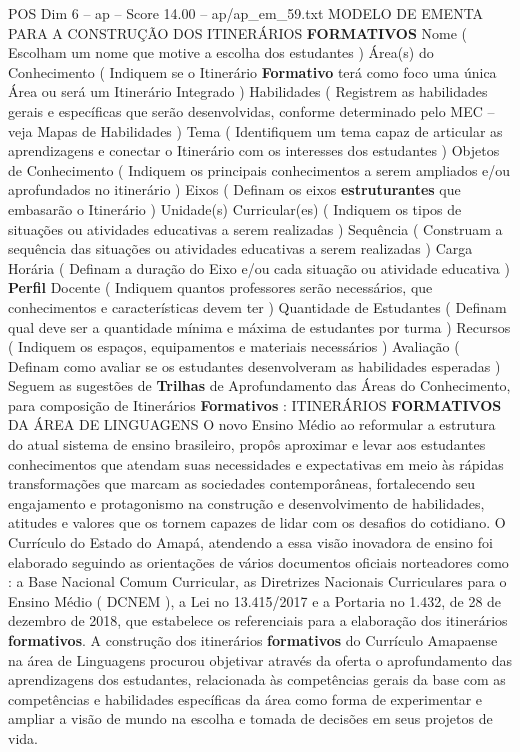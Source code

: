 \begin{textsample}{POS Dim 6 – ap – Score 14.00 – ap/ap\_em\_59.txt}  \label{ex:f6_pos_102}
MODELO DE EMENTA PARA A CONSTRUÇÃO DOS ITINERÁRIOS \textbf{FORMATIVOS} Nome ( Escolham um nome que motive a escolha dos estudantes ) Área(s) do Conhecimento ( Indiquem se o Itinerário \textbf{Formativo} terá como foco uma única Área ou será um Itinerário Integrado ) Habilidades ( Registrem as habilidades gerais e específicas que serão desenvolvidas, conforme determinado pelo MEC – veja Mapas de Habilidades ) Tema ( Identifiquem um tema capaz de articular as aprendizagens e conectar o Itinerário com os interesses dos estudantes ) Objetos de Conhecimento ( Indiquem os principais conhecimentos a serem ampliados e/ou aprofundados no itinerário ) Eixos ( Definam os eixos \textbf{estruturantes} que embasarão o Itinerário ) Unidade(s) Curricular(es) ( Indiquem os tipos de situações ou atividades educativas a serem realizadas ) Sequência ( Construam a sequência das situações ou atividades educativas a serem realizadas ) Carga Horária ( Definam a duração do Eixo e/ou cada situação ou atividade educativa ) \textbf{Perfil} Docente ( Indiquem quantos professores serão necessários, que conhecimentos e características devem ter ) Quantidade de Estudantes ( Definam qual deve ser a quantidade mínima e máxima de estudantes por turma ) Recursos ( Indiquem os espaços, equipamentos e materiais necessários ) Avaliação ( Definam como avaliar se os estudantes desenvolveram as habilidades esperadas ) Seguem as sugestões de \textbf{Trilhas} de Aprofundamento das Áreas do Conhecimento, para composição de Itinerários \textbf{Formativos} : ITINERÁRIOS \textbf{FORMATIVOS} DA ÁREA DE LINGUAGENS O novo Ensino Médio ao reformular a estrutura do atual sistema de ensino brasileiro, propôs aproximar e levar aos estudantes conhecimentos que atendam suas necessidades e expectativas em meio às rápidas transformações que marcam as sociedades contemporâneas, fortalecendo seu engajamento e protagonismo na construção e desenvolvimento de habilidades, atitudes e valores que os tornem capazes de lidar com os desafios do cotidiano.
O Currículo do Estado do Amapá, atendendo a essa visão inovadora de ensino foi elaborado seguindo as orientações de vários documentos oficiais norteadores como : a Base Nacional Comum Curricular, as Diretrizes Nacionais Curriculares para o Ensino Médio ( DCNEM ), a Lei no 13.415/2017 e a Portaria no 1.432, de 28 de dezembro de 2018, que estabelece os referenciais para a elaboração dos itinerários \textbf{formativos}.
A construção dos itinerários \textbf{formativos} do Currículo Amapaense na área de Linguagens procurou objetivar através da oferta o aprofundamento das aprendizagens dos estudantes, relacionada às competências gerais da base com as competências e habilidades específicas da área como forma de experimentar e ampliar a visão de mundo na escolha e tomada de decisões em seus projetos de vida.

\end{textsample}
